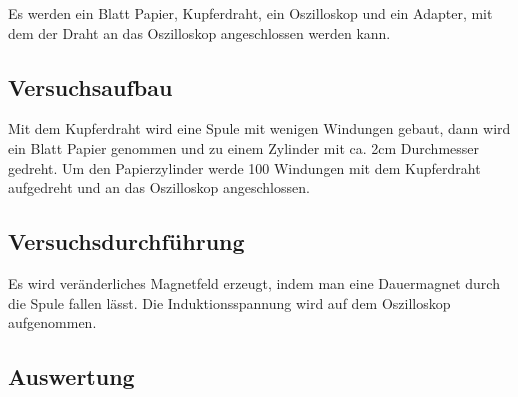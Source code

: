 \documentclass[12pt,a4paper]{article}
\begin{document}
Es werden ein Blatt Papier, Kupferdraht, ein Oszilloskop und ein Adapter, mit dem der Draht an das Oszilloskop angeschlossen werden kann.


\subsection*{Versuchsaufbau}

Mit dem Kupferdraht wird eine Spule mit wenigen Windungen gebaut, dann wird ein Blatt Papier genommen und zu einem Zylinder mit ca. 2cm Durchmesser gedreht. Um den Papierzylinder werde 100 Windungen mit dem Kupferdraht aufgedreht und an das Oszilloskop angeschlossen.


\subsection*{Versuchsdurchführung}

Es wird veränderliches Magnetfeld erzeugt, indem man eine Dauermagnet durch die Spule fallen lässt. Die Induktionsspannung wird auf dem Oszilloskop aufgenommen.


\subsection*{Auswertung}
\end{document}
